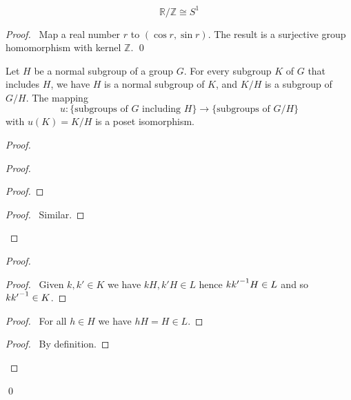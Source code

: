 \begin{ex}
\[ \mathbb{R} / \mathbb{Z} \cong S^1 \]
\end{ex}

\begin{proof}
\pf\ Map a real number $r$ to $(\cos r, \sin r)$. The result is a surjective group homomorphism with kernel $\mathbb{Z}$. \qed
\end{proof}

\begin{prop}
Let $H$ be a normal subgroup of a group $G$. For every subgroup $K$ of $G$ that includes $H$, we have $H$ is a normal subgroup of $K$, and $K/H$ is a subgroup of $G/H$. The mapping
\[ u : \{ \text{subgroups of } G \text{ including } H \} \rightarrow \{ \text{subgroups of } G / H \} \]
with $u(K) = K/H$ is a poset isomorphism.
\end{prop}

\begin{proof}
\pf
{}
\begin{proof}
	\begin{proof}
	\end{proof}
	\begin{proof}
		\pf\ Similar.
	\end{proof}
\end{proof}
\begin{proof}
	\begin{proof}
		\pf\ Given $k,k' \in K$ we have $kH,k'H \in L$ hence $k{k'}^{-1}H \in L$ and so $k{k'}^{-1} \in K$.
	\end{proof}
	\begin{proof}
		\pf\ For all $h \in H$ we have $hH = H \in L$.
	\end{proof}
	\begin{proof}
		\pf\ By definition.
	\end{proof}
\end{proof}
\qed
\end{proof}

